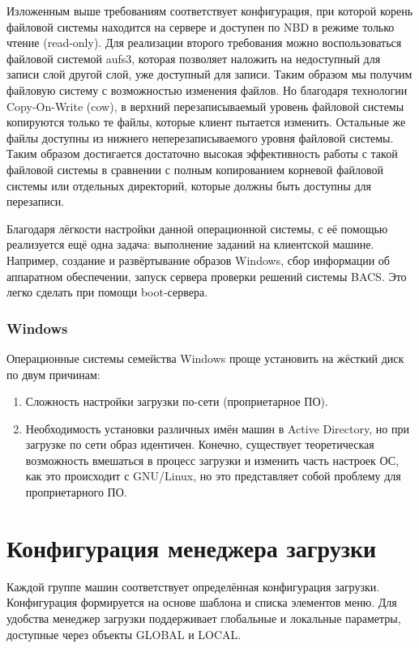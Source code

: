 \documentclass[11pt]{article}
\begin{document}
Изложенным выше требованиям соответствует конфигурация, при которой
корень файловой системы находится на сервере и доступен по NBD
в режиме только чтение (read-only). Для реализации второго требования
можно воспользоваться файловой системой aufs3, которая позволяет
наложить на недоступный для записи слой другой слой,
уже доступный для записи. Таким образом мы получим файловую систему
с возможностью изменения файлов. Но благодаря технологии Copy-On-Write (cow),
в верхний перезаписываемый уровень файловой системы копируются только те файлы,
которые клиент пытается изменить. Остальные же файлы доступны из нижнего
неперезаписываемого уровня файловой системы. Таким образом достигается
достаточно высокая эффективность работы с такой файловой системы в сравнении
с полным копированием корневой файловой системы или отдельных директорий,
которые должны быть доступны для перезаписи.

Благодаря лёгкости настройки данной операционной системы, с её помощью реализуется
ещё одна задача: выполнение заданий на клиентской машине. Например,
создание и развёртывание образов Windows, сбор информации об аппаратном
обеспечении, запуск сервера проверки решений системы BACS. Это легко сделать
при помощи boot-сервера.

\subsubsection{Windows}
Операционные системы семейства Windows проще установить на жёсткий
диск по двум причинам:
\begin{enumerate}
    \item Сложность настройки загрузки по-сети (проприетарное ПО).
    \item Необходимость установки различных имён машин в Active Directory,
        но при загрузке по сети образ идентичен. Конечно, существует
        теоретическая возможность вмешаться в процесс загрузки и изменить
        часть настроек ОС, как это происходит с GNU/Linux, но это представляет
        собой проблему для проприетарного ПО.
\end{enumerate}

\section{Конфигурация менеджера загрузки}
Каждой группе машин соответствует определённая конфигурация загрузки.
Конфигурация формируется на основе шаблона и списка элементов меню.
Для удобства менеджер загрузки поддерживает глобальные и локальные параметры,
доступные через объекты GLOBAL и LOCAL.
\end{document}
